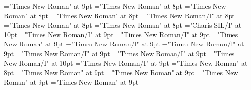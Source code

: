\documentclass[gps1,twoside]{article}
\begin{document}
\font\examplessensesensesentryaftersensespanspandiventryletData="Times New Roman" at 9pt
\font\examplespansensespanspandiventryletData="Times New Roman" at 8pt
\font\examplebeforespansensespanspandiventryletData="Times New Roman" at 8pt
\font\exampleafterspansensespanspandiventryletData="Times New Roman" at 8pt
\font\exampleexamplespansensespanspandiventryletData="Times New Roman/I" at 8pt
\font\examplebeforeexamplespansensespanspandiventryletData="Times New Roman" at 8pt
\font\exampleafterexamplespansensespanspandiventryletData="Times New Roman" at 8pt
\font\spanbzhexampleexamplespansensespanspandiventryletData="Charis SIL/I" at 10pt
\font\spanexampleexampleexamplessensesensessensesensessubentrysubentriesentrylastchildafterexampleexamplespansensespanspandiventryletData="Times New Roman/I" at 9pt
\font\spanexampleexampleexamplessensesensessensesensessubentrysubentriesentryexamplespansensespanspandiventryletData="Times New Roman/I" at 9pt
\font\spanexampleexampleexamplessensesensessensesensessubentrysubentriesentrylastchildafterexamplespansensespanspandiventryletData="Times New Roman" at 9pt
\font\translationspanexampleexampleexamplessensesensessensesensessubentrysubentriesentryexamplespansensespanspandiventryletData="Times New Roman/I" at 9pt
\font\translationafterspanexampleexampleexamplessensesensessensesensessubentrysubentriesentryexamplespansensespanspandiventryletData="Times New Roman/I" at 9pt
\font\translationtranslationspanexampleexampleexamplessensesensessensesensessubentrysubentriesentryexamplespansensespanspandiventryletData="Times New Roman/I" at 9pt
\font\translationaftertranslationspanexampleexampleexamplessensesensessensesensessubentrysubentriesentryexamplespansensespanspandiventryletData="Times New Roman/I" at 9pt
\font\spanentranslationtranslationspanexampleexampleexamplessensesensessensesensessubentrysubentriesentryexamplespansensespanspandiventryletData="Times New Roman/I" at 10pt
\font\spantranslationtranslationtranslationsexampleexamplessensesensessensesensessubentrysubentriesentrylastchildaftertranslationtranslationspanexampleexampleexamplessensesensessensesensessubentrysubentriesentryexamplespansensespanspandiventryletData="Times New Roman/I" at 9pt
\font\exampleexampleexamplessensesensessensesensesentrybeforespansensespanspandiventryletData="Times New Roman" at 8pt
\font\semanticdomainssensesensesentrybeforesensespanspandiventryletData="Times New Roman" at 9pt
\font\semanticdomainssensesensesentryaftersensespanspandiventryletData="Times New Roman" at 9pt
\font\spanspansensespanspandiventryletData="Times New Roman" at 9pt
\font\spanspanspansensespanspandiventryletData="Times New Roman" at 9pt
\end{document}
